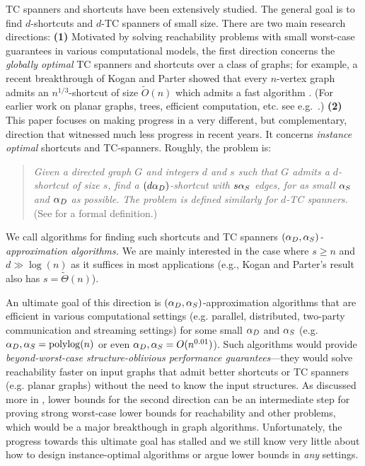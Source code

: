 TC spanners and shortcuts have been extensively studied.  The general goal is to find $d$-shortcuts and $d$-TC spanners of small size. 
There are two main research directions:
{\bf (1)} 
Motivated by solving reachability problems with small worst-case guarantees in various computational models, 
the first direction concerns the {\em globally optimal} TC spanners and shortcuts over a class of graphs;
for example, a recent breakthrough of Kogan and Parter \cite{KoganP22} showed that every $n$-vertex graph admits an $n^{1/3}$-shortcut of size $\tilde O(n)$ which admits a fast algorithm \cite{KoganP-icalp22}. (For earlier work on planar graphs, trees, efficient computation, etc. see e.g.~\cite{Fineman20,Thorup97,Chazelle87a,Yao82}.) 
{\bf (2)} This paper focuses on making progress in a very different, but complementary,  direction that witnessed much less progress in recent years.
It concerns {\em instance optimal} shortcuts and TC-spanners. 
Roughly, the problem is: 
\begin{quote}
{\em     
Given a directed graph $G$ and integers $d$ and $s$ such that $G$ admits a $d$-shortcut of size $s$, find a $(d\alpha_D)$-shortcut with $s\alpha_S$ edges, for as small $\alpha_S$ and $\alpha_D$ as possible. 
The problem is defined similarly for $d$-TC spanners.
} (See  for a formal definition.) 
\end{quote}
We call algorithms for finding such shortcuts and TC spanners {\em $(\alpha_D,\alpha_S)$-approximation algorithms.}
We are mainly interested in the case where $s\geq n$ and $d\gg \log(n)$ as it suffices in most applications (e.g., Kogan and Parter's result also has $s=\tilde{\Theta}(n)$). 



An ultimate goal of this direction is $(\alpha_D,\alpha_S)$-approximation algorithms that are efficient in various computational settings (e.g. parallel, distributed, two-party communication and streaming settings) for some small $\alpha_D$ and $\alpha_S$ (e.g. $\alpha_D,\alpha_S=\mathrm{polylog}(n)$ or even $\alpha_D,\alpha_S=O(n^{0.01})$). 
Such algorithms would provide  {\em beyond-worst-case  structure-oblivious performance guarantees}---they would solve reachability faster on input graphs that admit better shortcuts or TC spanners (e.g. planar graphs) without the need to know the input structures.  
As discussed more in , lower bounds for the second direction can be an intermediate step for proving strong worst-case lower bounds for reachability and other problems, which would be a major breakthough in graph algorithms.  
Unfortunately, 
the progress towards this ultimate goal has stalled and we still know very little about how to design instance-optimal algorithms or argue lower bounds in {\em any} settings. 

